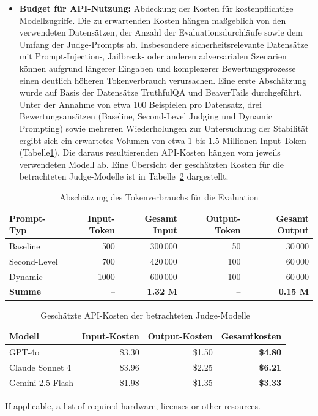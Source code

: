 \documentclass[ngerman]{rwureport}
\begin{document}
{{{{{\begin{itemize}
			\item \textbf{Budget für API-Nutzung:} Abdeckung der Kosten für kostenpflichtige Modellzugriffe.
			Die zu erwartenden Kosten hängen maßgeblich von den verwendeten Datensätzen, der Anzahl der Evaluationsdurchläufe sowie dem Umfang der Judge-Prompts ab. Insbesondere sicherheitsrelevante Datensätze mit Prompt-Injection-, Jailbreak- oder anderen adversarialen Szenarien können aufgrund längerer Eingaben und komplexerer Bewertungsprozesse einen deutlich höheren Tokenverbrauch verursachen.
			Eine erste Abschätzung wurde auf Basis der Datensätze TruthfulQA und BeaverTails durchgeführt. Unter der Annahme von etwa 100 Beispielen pro Datensatz, drei Bewertungsansätzen (Baseline, Second-Level Judging und Dynamic Prompting) sowie mehreren Wiederholungen zur Untersuchung der Stabilität ergibt sich ein erwartetes Volumen von etwa 1 bis 1.5 Millionen Input-Token (Tabelle\ref{tab:token_usage}). Die daraus resultierenden API-Kosten hängen vom jeweils verwendeten Modell ab. Eine Übersicht der geschätzten Kosten für die betrachteten Judge-Modelle ist in Tabelle~\ref{tab:api_costs} dargestellt.
		\end{itemize}}
		\begin{table}[ht]
		\centering
		\caption{Abschätzung des Tokenverbrauchs für die Evaluation}
		\label{tab:token_usage}
		\begin{tabular}{lrrrr}
			\toprule
			\textbf{Prompt-Typ} & 
			\textbf{Input-Token} & 
			\textbf{Gesamt Input} & 
			\textbf{Output-Token} & 
			\textbf{Gesamt Output} \\
			\midrule
			Baseline      & 500  & 300\,000 & 50  & 30\,000 \\
			Second-Level  & 700  & 420\,000 & 100 & 60\,000 \\
			Dynamic       & 1000 & 600\,000 & 100 & 60\,000 \\
			\midrule
			\textbf{Summe} & -- & \textbf{1.32 M} & -- & \textbf{0.15 M} \\
			\bottomrule
		\end{tabular}
	\end{table}
	\begin{table}[ht]
		\centering
		\caption{Geschätzte API-Kosten der betrachteten Judge-Modelle}
		\label{tab:api_costs}
		\begin{tabular}{lrrr}
			\toprule
			\textbf{Modell} & 
			\textbf{Input-Kosten} & 
			\textbf{Output-Kosten} & 
			\textbf{Gesamtkosten} \\
			\midrule
			GPT-4o              & \$3.30 & \$1.50 & \textbf{\$4.80} \\
			Claude Sonnet 4     & \$3.96 & \$2.25 & \textbf{\$6.21} \\
			Gemini 2.5 Flash    & \$1.98 & \$1.35 & \textbf{\$3.33} \\
			\bottomrule
		\end{tabular}
	\end{table}
}
{{If applicable, a list of required hardware, licenses or other resources.}}

}}}
\end{document}
